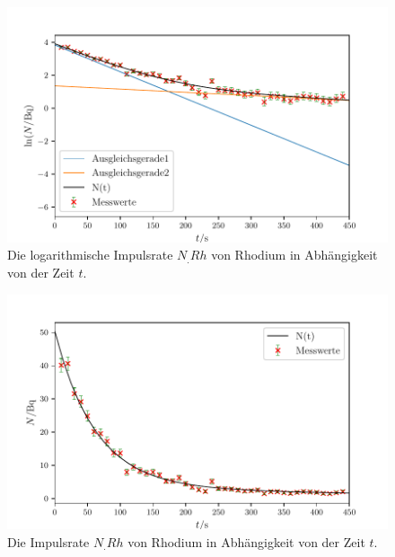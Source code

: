 \begin{figure}
	\centering
	\includegraphics[width=\linewidth-50pt,height=\textheight-50pt,keepaspectratio]{content/images/RhodiumLog.pdf}
	\caption{Die logarithmische Impulsrate $N_.{Rh}$ von Rhodium in Abhängigkeit von der Zeit $t$.}
	\label{fig:RhodiumLog}
\end{figure}

\begin{figure}
	\centering
	\includegraphics[width=\linewidth-50pt,height=\textheight-50pt,keepaspectratio]{content/images/Rhodium.pdf}
	\caption{Die Impulsrate $N_.{Rh}$ von Rhodium in Abhängigkeit von der Zeit $t$.}
	\label{fig:Rhodium}
\end{figure}
